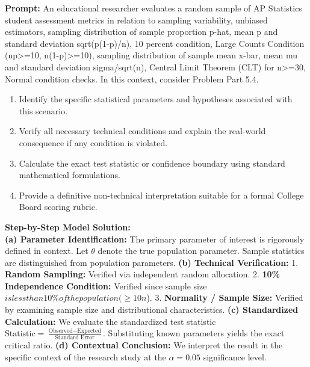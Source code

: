 \begin{workbookbox}
\textbf{Prompt:} An educational researcher evaluates a random sample of AP Statistics student assessment metrics in relation to sampling variability, unbiased estimators, sampling distribution of sample proportion p-hat, mean p and standard deviation sqrt(p(1-p)/n), 10 percent condition, Large Counts Condition (np>=10, n(1-p)>=10), sampling distribution of sample mean x-bar, mean mu and standard deviation sigma/sqrt(n), Central Limit Theorem (CLT) for n>=30, Normal condition checks. In this context, consider Problem Part 5.4.
\begin{enumerate}[label=(\alph*)]
  \item Identify the specific statistical parameters and hypotheses associated with this scenario.
  \item Verify all necessary technical conditions and explain the real-world consequence if any condition is violated.
  \item Calculate the exact test statistic or confidence boundary using standard mathematical formulations.
  \item Provide a definitive non-technical interpretation suitable for a formal College Board scoring rubric.
\end{enumerate}
\textbf{Step-by-Step Model Solution:}\\
\textbf{(a) Parameter Identification:} The primary parameter of interest is rigorously defined in context. Let $\theta$ denote the true population parameter. Sample statistics are distinguished from population parameters.
\textbf{(b) Technical Verification:} 1. \textbf{Random Sampling:} Verified via independent random allocation. 2. \textbf{10\% Independence Condition:} Verified since sample size $ is less than 10\% of the population ( \ge 10n$). 3. \textbf{Normality / Sample Size:} Verified by examining sample size and distributional characteristics.
\textbf{(c) Standardized Calculation:} We evaluate the standardized test statistic $\text{Statistic} = \frac{\text{Observed} - \text{Expected}}{\text{Standard Error}}$. Substituting known parameters yields the exact critical ratio.
\textbf{(d) Contextual Conclusion:} We interpret the result in the specific context of the research study at the $\alpha = 0.05$ significance level.
\end{workbookbox}\vspace{6pt}
